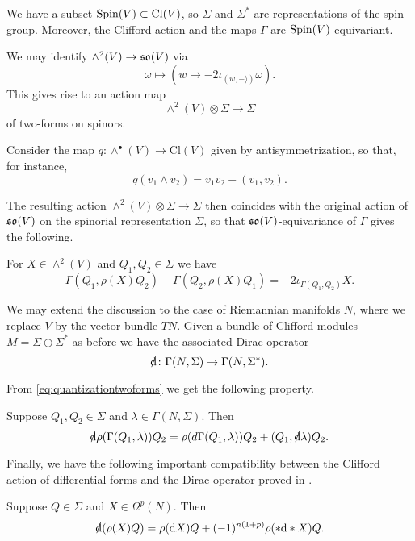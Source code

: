 \documentclass[10pt, oneside]{article}
\newcommand{\Cl}{\mathrm{Cl}}
\begin{document}
We have a subset $\Spin(V)\subset \Cl(V)$, so $\Sigma$ and $\Sigma^*$ are representations of the spin group. Moreover, the Clifford action and the maps $\Gamma$ are $\mathrm{Spin}(V)$-equivariant.

We may identify $\wedge^2(V)\rightarrow \mathfrak{so}(V)$ via
\[\omega\mapsto (w\mapsto -2\iota_{(w, -\rangle)} \omega).\]
This gives rise to an action map
\[\wedge^2(V)\otimes \Sigma\longrightarrow \Sigma\]
of two-forms on spinors.

Consider the map $q\colon \wedge^\bullet(V)\rightarrow \Cl(V)$ given by antisymmetrization, so that, for instance,
\begin{equation}
q(v_1\wedge v_2) = v_1v_2 - (v_1, v_2).
\label{eq:quantizationtwoforms}
\end{equation}

The resulting action $\wedge^2(V)\otimes \Sigma\rightarrow \Sigma$ then coincides with the original action of $\mathfrak{so}(V)$ on the spinorial representation $\Sigma$, so that $\mathfrak{so}(V)$-equivariance of $\Gamma$ gives the following.

\begin{prop}
For $X\in\wedge^2(V)$ and $Q_1,Q_2\in\Sigma$ we have
\[\Gamma(Q_1, \rho(X) Q_2) + \Gamma(Q_2, \rho(X) Q_1) = -2\iota_{\Gamma(Q_1, Q_2)} X.\]
\label{prop:cliffordactionproperty1}
\end{prop}

We may extend the discussion to the case of Riemannian manifolds $N$, where we replace $V$ by the vector bundle $TN$. Given a bundle of Clifford modules $M=\Sigma\oplus \Sigma^*$ as before we have the associated Dirac operator
\[\sd{\d}\colon \Gamma(N, \Sigma)\rightarrow \Gamma(N, \Sigma^*).\]

From \eqref{eq:quantizationtwoforms} we get the following property.

\begin{prop}
Suppose $Q_1,Q_2\in\Sigma$ and $\lambda\in\Gamma(N, \Sigma)$. Then
\[\sd{\d}\rho(\Gamma(Q_1, \lambda)) Q_2 = \rho(d \Gamma(Q_1, \lambda)) Q_2 + (Q_1, \sd{\d} \lambda) Q_2.\]
\label{prop:cliffordactionproperty2}
\end{prop}

Finally, we have the following important compatibility between the Clifford action of differential forms and the Dirac operator proved in \cite[equation 7.6]{Snygg}.

\begin{prop}
Suppose $Q\in\Sigma$ and $X\in\Omega^p(N)$. Then
\[\sd{\d}(\rho(X) Q) = \rho(\d X)Q + (-1)^{n(1+p)}\rho(\ast \d\ast X) Q.\]
\label{prop:cliffordactionproperty3}
\end{prop}
\end{document}
